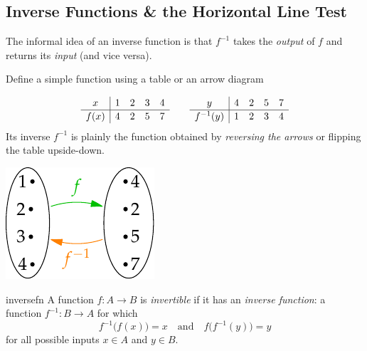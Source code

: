 \clearpage


\subsection{Inverse Functions \& the Horizontal Line Test}

The informal idea of an inverse function is that $f^{-1}$ takes the \emph{output} of $f$ and returns its \emph{input} (and vice versa).

\begin{example}{}{}
Define a simple function using a table or an arrow diagram\par
\begin{minipage}[t]{0.74\linewidth}\vspace{-17pt}
\[\def\arraystretch{1.1}\begin{array}{c|cccc}
x&1&2&3&4\\\hline
f(x)&4&2&5&7
\end{array}\qquad\begin{array}{c|cccc}
y&4&2&5&7\\\hline
f^{-1}(y)&1&2&3&4
\end{array}
\]
Its inverse $f^{-1}$ is plainly the function obtained by \emph{reversing the arrows} or flipping the table upside-down.
\end{minipage}\hfill\begin{minipage}[t]{0.25\linewidth}\vspace{-17pt}
\flushright\includegraphics{inverse-easy}
\end{minipage}
\end{example}

\begin{defn}{}{inversefn}
A function $f:A\to B$ is \emph{invertible} if it has an \emph{inverse function}: a function $f^{-1}:B\to A$ for which
\[f^{-1}\bigl(f(x)\bigr)=x\quad\text{and}\quad f\bigl(f^{-1}(y)\bigr)=y\tag{$\ast$}\]
for all possible inputs $x\in A$ and $y\in B$.
\end{defn}

